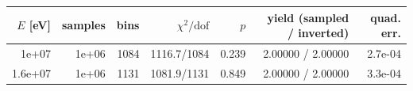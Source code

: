 \begin{tabular}{rrrrrrr}
\toprule
$E$ [eV] & samples & bins & $\chi^2/\mathrm{dof}$ & $p$ & yield (sampled / inverted) & quad. err. \\
\midrule
1e+07 & 1e+06 & 1084 & 1116.7/1084 & 0.239 & 2.00000 / 2.00000 & 2.7e-04 \\
1.6e+07 & 1e+06 & 1131 & 1081.9/1131 & 0.849 & 2.00000 / 2.00000 & 3.3e-04 \\
\bottomrule
\end{tabular}
